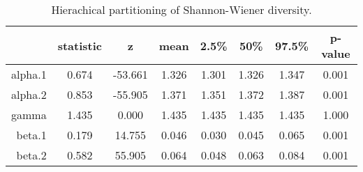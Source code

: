 \documentclass[12pt]{article}
\begin{document}
\begin{table}[ht]
\caption{Hierachical partitioning of Shannon-Wiener diversity.} 
\centering
\begin{tabular}{rccccccc}
  \hline
 & \textbf{statistic} & \textbf{z} & \textbf{mean} & \textbf{2.5\%} & \textbf{50\%} & \textbf{97.5\%} & \textbf{p-value} \\ 
  \hline
alpha.1 & 0.674 & -53.661 & 1.326 & 1.301 & 1.326 & 1.347 & 0.001 \\ 
  alpha.2 & 0.853 & -55.905 & 1.371 & 1.351 & 1.372 & 1.387 & 0.001 \\ 
  gamma & 1.435 & 0.000 & 1.435 & 1.435 & 1.435 & 1.435 & 1.000 \\ 
  beta.1 & 0.179 & 14.755 & 0.046 & 0.030 & 0.045 & 0.065 & 0.001 \\ 
  beta.2 & 0.582 & 55.905 & 0.064 & 0.048 & 0.063 & 0.084 & 0.001 \\ 
   \hline
\end{tabular}
\label{tab:adipart}
\end{table}
\end{document}
